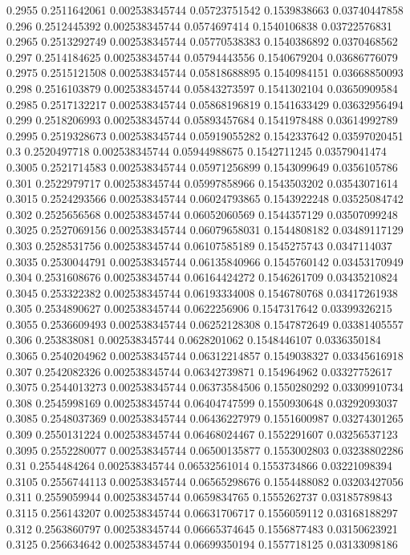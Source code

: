 {0.2955 0.2511642061 0.002538345744 0.05723751542 0.1539838663 0.03740447858
0.296 0.2512445392 0.002538345744 0.0574697414 0.1540106838 0.03722576831
0.2965 0.2513292749 0.002538345744 0.05770538383 0.1540386892 0.0370468562
0.297 0.2514184625 0.002538345744 0.05794443556 0.1540679204 0.03686776079
0.2975 0.2515121508 0.002538345744 0.05818688895 0.1540984151 0.03668850093
0.298 0.2516103879 0.002538345744 0.05843273597 0.1541302104 0.03650909584
0.2985 0.2517132217 0.002538345744 0.05868196819 0.1541633429 0.03632956494
0.299 0.2518206993 0.002538345744 0.05893457684 0.1541978488 0.03614992789
0.2995 0.2519328673 0.002538345744 0.05919055282 0.1542337642 0.03597020451
0.3 0.2520497718 0.002538345744 0.05944988675 0.1542711245 0.03579041474
0.3005 0.2521714583 0.002538345744 0.05971256899 0.1543099649 0.0356105786
0.301 0.2522979717 0.002538345744 0.05997858966 0.1543503202 0.03543071614
0.3015 0.2524293566 0.002538345744 0.06024793865 0.1543922248 0.03525084742
0.302 0.2525656568 0.002538345744 0.06052060569 0.1544357129 0.03507099248
0.3025 0.2527069156 0.002538345744 0.06079658031 0.1544808182 0.03489117129
0.303 0.2528531756 0.002538345744 0.06107585189 0.1545275743 0.0347114037
0.3035 0.2530044791 0.002538345744 0.06135840966 0.1545760142 0.03453170949
0.304 0.2531608676 0.002538345744 0.06164424272 0.1546261709 0.03435210824
0.3045 0.253322382 0.002538345744 0.06193334008 0.1546780768 0.03417261938
0.305 0.2534890627 0.002538345744 0.0622256906 0.1547317642 0.03399326215
0.3055 0.2536609493 0.002538345744 0.06252128308 0.1547872649 0.03381405557
0.306 0.253838081 0.002538345744 0.0628201062 0.1548446107 0.0336350184
0.3065 0.2540204962 0.002538345744 0.06312214857 0.1549038327 0.03345616918
0.307 0.2542082326 0.002538345744 0.06342739871 0.154964962 0.03327752617
0.3075 0.2544013273 0.002538345744 0.06373584506 0.1550280292 0.03309910734
0.308 0.2545998169 0.002538345744 0.06404747599 0.1550930648 0.03292093037
0.3085 0.2548037369 0.002538345744 0.06436227979 0.1551600987 0.03274301265
0.309 0.2550131224 0.002538345744 0.06468024467 0.1552291607 0.03256537123
0.3095 0.2552280077 0.002538345744 0.06500135877 0.1553002803 0.03238802286
0.31 0.2554484264 0.002538345744 0.06532561014 0.1553734866 0.03221098394
0.3105 0.2556744113 0.002538345744 0.06565298676 0.1554488082 0.03203427056
0.311 0.2559059944 0.002538345744 0.0659834765 0.1555262737 0.03185789843
0.3115 0.256143207 0.002538345744 0.06631706717 0.1556059112 0.03168188297
0.312 0.2563860797 0.002538345744 0.06665374645 0.1556877483 0.03150623921
0.3125 0.256634642 0.002538345744 0.06699350194 0.1557718125 0.03133098186
}
